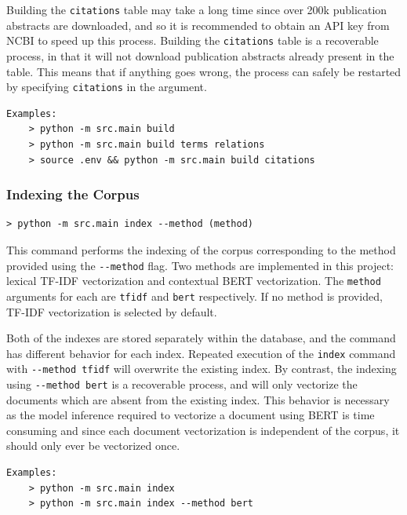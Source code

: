 \documentclass[11pt]{article}
\theoremstyle{plain}
\theoremstyle{definition}
\begin{document}
Building the \verb|citations| table may take a long time since over 200k publication abstracts are downloaded, and so it is recommended to obtain an API key from NCBI to speed up this process. Building the \verb|citations| table is a recoverable process, in that it will not download publication abstracts already present in the table. This means that if anything goes wrong, the process can safely be restarted by specifying \verb|citations| in the argument.

\begin{Verbatim}[frame=single, fontsize=\small]
    Examples:
    > python -m src.main build
    > python -m src.main build terms relations
    > source .env && python -m src.main build citations
\end{Verbatim}

\subsubsection{Indexing the Corpus}\label{sec:manual-cli-index}

\begin{center}
    \begin{Verbatim}[frame=single, fontsize=\small]
        > python -m src.main index --method (method)
    \end{Verbatim}
\end{center}

This command performs the indexing of the corpus corresponding to the method provided using the \verb|--method| flag. Two methods are implemented in this project: lexical TF-IDF vectorization and contextual BERT vectorization. The \verb|method| arguments for each are \verb|tfidf| and \verb|bert| respectively. If no method is provided, TF-IDF vectorization is selected by default.

Both of the indexes are stored separately within the database, and the command has different behavior for each index. Repeated execution of the \verb|index| command with \verb|--method tfidf| will overwrite the existing index. By contrast, the indexing using \verb|--method bert| is a recoverable process, and will only vectorize the documents which are absent from the existing index. This behavior is necessary as the model inference required to vectorize a document using BERT is time consuming and since each document vectorization is independent of the corpus, it should only ever be vectorized once.

\begin{Verbatim}[frame=single, fontsize=\small]
    Examples:
    > python -m src.main index
    > python -m src.main index --method bert
\end{Verbatim}
\end{document}
